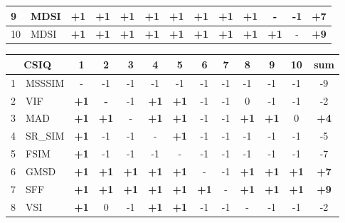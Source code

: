 \begin{table*}[htb]
{\begin{tabular}{|l|l|c|c|c|c|c|c|c|c|c|c||c|}
9           & MDSI            & \textbf{+1} & \textbf{+1} & \textbf{+1} & \textbf{+1} & \textbf{+1} & \textbf{+1} & \textbf{+1} & \textbf{+1} & -           & -1 & \textbf{+7} \\ \hline
10          & MDSI           & \textbf{+1} & \textbf{+1} & \textbf{+1} & \textbf{+1} & \textbf{+1} & \textbf{+1} & \textbf{+1} & \textbf{+1} & \textbf{+1} & -  & \textbf{+9} \\ \hline
\end{tabular}
\hspace*{2 mm}
\begin{tabular}{|l|l|c|c|c|c|c|c|c|c|c|c||c|}
\hline
\multicolumn{2}{|c|}{CSIQ} & 1           & 2           & 3           & 4           & 5           & 6           & 7  & 8           & 9           & 10          & sum         \\ \hline
1         & MSSSIM         & -           & -1          & -1          & -1          & -1          & -1          & -1 & -1          & -1          & -1          & -9          \\ \hline
2         & VIF            & \textbf{+1} & \textbf{-}  & -1          & \textbf{+1} & \textbf{+1} & -1          & -1 & 0           & -1          & -1          & -2          \\ \hline
3         & MAD            & \textbf{+1} & \textbf{+1} & -           & \textbf{+1} & \textbf{+1} & -1          & -1 & \textbf{+1} & \textbf{+1} & 0           & \textbf{+4} \\ \hline
4         & SR\_SIM        & \textbf{+1} & -1          & -1          & -           & \textbf{+1} & -1          & -1 & -1          & -1          & -1          & -5          \\ \hline
5         & FSIM          & \textbf{+1} & -1          & -1          & -1          & -           & -1          & -1 & -1          & -1          & -1          & -7          \\ \hline
6         & GMSD           & \textbf{+1} & \textbf{+1} & \textbf{+1} & \textbf{+1} & \textbf{+1} & -           & -1 & \textbf{+1} & \textbf{+1} & \textbf{+1} & \textbf{+7} \\ \hline
7         & SFF            & \textbf{+1} & \textbf{+1} & \textbf{+1} & \textbf{+1} & \textbf{+1} & \textbf{+1} & -  & \textbf{+1} & \textbf{+1} & \textbf{+1} & \textbf{+9} \\ \hline
8         & VSI            & \textbf{+1} & 0           & -1          & \textbf{+1} & \textbf{+1} & -1          & -1 & -           & -1          & -1          & -2          \\ \hline

\end{tabular}}
\end{table*}
